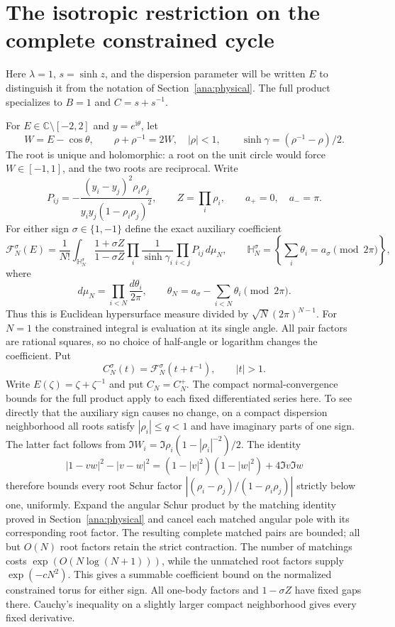 \documentclass[11pt]{article}
\numberwithin{equation}{section}
\theoremstyle{definition}
\newcommand{\C}{\mathbb C}
\newcommand{\ii}{\mathrm i}
\begin{document}
\section{The isotropic restriction on the complete constrained cycle}
\label{iso:section}

Here $\lambda=1$, $s=\sinh z$, and the dispersion parameter will be
written ${E}$ to distinguish it from the notation of
Section~\ref{ana:physical}. The full product specializes to $B=1$
and $C=s+s^{-1}$.

For ${E}\in\C\setminus[-2,2]$ and $y=e^{\ii\theta}$, let
\[
 W={E}-\cos\theta,\qquad
 \rho+\rho^{-1}=2W,\quad |\rho|<1,\qquad
 \sinh\gamma=(\rho^{-1}-\rho)/2.
\]
The root is unique and holomorphic: a root on the unit circle would
force $W\in[-1,1]$, and the two roots are reciprocal.  Write
\[
 P_{ij}=-\frac{(y_i-y_j)^2\rho_i\rho_j}
                  {y_i y_j(1-\rho_i\rho_j)^2},\qquad
 Z=\prod_i\rho_i,
 \qquad a_+=0,\quad a_-=\pi.
\]
For either sign $\sigma\in\{1,-1\}$ define the exact auxiliary coefficient
\begin{equation}\label{iso:angular}
 \mathcal F_N^\sigma({E})
 =\frac1{N!}\int_{\mathbb H_N^\sigma}
       \frac{1+\sigma Z}{1-\sigma Z}
       \prod_i\frac1{\sinh\gamma_i}\prod_{i<j}P_{ij}\,d\mu_N,
 \qquad
 \mathbb H_N^\sigma=\left\{\sum_i\theta_i=a_\sigma
                                    \pmod{2\pi}\right\},
\end{equation}
where
\[
 d\mu_N=\prod_{i<N}\frac{d\theta_i}{2\pi},\qquad
 \theta_N=a_\sigma-\sum_{i<N}\theta_i\pmod{2\pi}.
\]
Thus this is Euclidean hypersurface measure divided by
$\sqrt N(2\pi)^{N-1}$.  For $N=1$ the constrained integral is evaluation
at its single angle.  All pair factors are rational squares, so no
choice of half-angle or logarithm changes the coefficient.  Put
\begin{equation}\label{eq:iso-exterior-coefficients}
 C_N^\sigma(t)=\mathcal F_N^\sigma(t+t^{-1}),\qquad |t|>1.
\end{equation}
Write $E(\zeta)=\zeta+\zeta^{-1}$ and put $C_N=C_N^+$. The compact normal-convergence bounds for the full product apply to
each fixed differentiated series here.  To see directly that the
auxiliary sign causes no change, on a compact dispersion neighborhood
all roots satisfy $|\rho_i|\le q<1$ and have imaginary parts of one
sign.  The latter fact follows from
$\Im W_i=\Im\rho_i(1-|\rho_i|^{-2})/2$.
The identity
\[
 |1-vw|^2-|v-w|^2
   =(1-|v|^2)(1-|w|^2)+4\Im v\Im w
\]
therefore bounds every root Schur factor
$|(\rho_i-\rho_j)/(1-\rho_i\rho_j)|$ strictly below one, uniformly.
Expand the angular Schur product by the matching identity proved
in Section~\ref{ana:physical} and cancel each matched angular pole
with its corresponding root factor.  The resulting complete matched
pairs are bounded; all but $O(N)$ root factors retain the strict
contraction.  The number of matchings costs
$\exp(O(N\log(N+1)))$, while the unmatched root factors supply
$\exp(-cN^2)$.  This gives a summable coefficient bound on the
normalized constrained torus for either sign.  All one-body factors
and $1-\sigma Z$ have fixed gaps there.  Cauchy's inequality on a
slightly larger compact neighborhood gives every fixed derivative.
\end{document}
